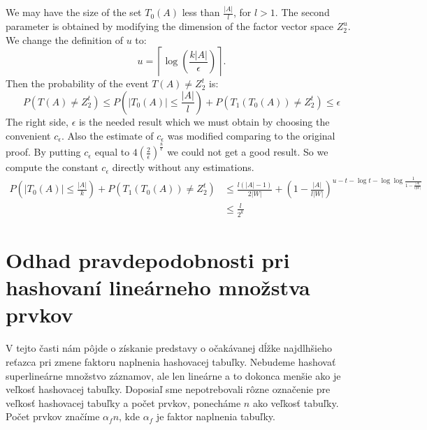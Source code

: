 We may have the size of the set $T_0(A)$ less than $\frac{|A|}{l}$, for $l > 1$. The second parameter is obtained by modifying the dimension of the factor vector space $Z_2^u$. We change the definition of $u$ to:
\begin{displaymath}
u = \left\lceil \log \left(\frac{k |A|}{\epsilon}\right) \right\rceil \textit{.}
\end{displaymath}
Then the probability of the event $T(A) \neq Z_2^t$ is:
\begin{displaymath}
P(T(A) \neq Z_2^t) \leq P(|T_0(A)| \leq \frac{|A|}{l}) + P(T_1(T_0(A)) \neq Z_2^t) \leq \epsilon
\end{displaymath}
The right side, $\epsilon$ is the needed result which we must obtain by choosing the convenient $c_{\epsilon}$. Also the estimate of $c_{\epsilon}$ was modified comparing to the original proof. By putting $c_{\epsilon}$ equal to $4\left(\frac{2}{\epsilon}\right)^{\frac{8}{\epsilon}}$ we could not get a good result. So we compute the constant $c_{\epsilon}$ directly without any estimations.
\begin{displaymath}
\begin{split}
P(|T_0(A)| \leq \frac{|A|}{k}) + P(T_1(T_0(A)) \neq Z_2^t) 
& \leq \frac{l(|A| - 1)}{2|W|} + \left(1 - \frac{|A|}{l|W|}\right)^{u - t - \log t - \log \log \frac{1}{1 - \frac{|A|}{l|W|}}} \\
& \leq \frac{l}{2^k}
\end{split}
\end{displaymath}

\section{Odhad pravdepodobnosti pri hashovaní li\-ne\-ár\-ne\-ho množstva prvkov}
V tejto časti nám pôjde o získanie predstavy o očakávanej dĺžke najdlhšieho reťazca pri zmene faktoru naplnenia hashovacej tabuľky. Nebudeme hashovať superlineárne množstvo záznamov, ale len lineárne a to dokonca menšie ako je veľkosť hashovacej tabuľky. Doposiaľ sme nepotrebovali rôzne označenie pre veľkosť hashovacej tabuľky a počet prvkov, ponecháme $n$ ako veľkosť tabuľky. Počet prvkov značíme $\alpha_f n$, kde $\alpha_f$ je faktor naplnenia tabuľky.

